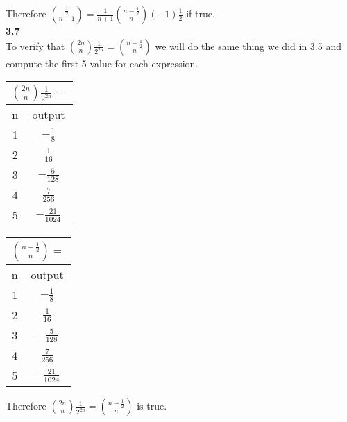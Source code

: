 \documentclass[10pt,a4paper]{report}
\begin{document}
	
	Therefore $\binom{\frac{1}{2}}{n+1} = \frac{1}{n+1}\binom{n-\frac{1}{2}}{n}(-1)\frac{1}{2}$ if true.\\
	\newline
	\textbf{3.7}\\
	To verify that $\binom{2n}{n}\frac{1}{2^{2n}} = \binom{n-\frac{1}{2}}{n}$ we will do the same thing we did in 3.5 and compute the first 5 value for each expression.\\
	\begin{center}
		\begin{tabular}{|c|c|}
			\hline
			\multicolumn{2}{|c|}{$\binom{2n}{n}\frac{1}{2^{2n}} = $} \\[.25cm]
			\hline
			n&output\\
			\hline
			1&$-\frac{1}{8}$\\[.25cm]
			\hline
			2&$\frac{1}{16}$\\[.25cm]
			\hline
			3&$-\frac{5}{128}$\\[.25cm]
			\hline
			4&$\frac{7}{256}$\\[.25cm]
			\hline
			5&$-\frac{21}{1024}$\\[.25cm]
			\hline
		\end{tabular}
		\hspace{2em}
		\begin{tabular}{|c|c|}
			\hline
			\multicolumn{2}{|c|}{$\binom{n-\frac{1}{2}}{n} = $} \\[.25cm]
			\hline
			n&output\\
			\hline
			1&$-\frac{1}{8}$\\[.25cm]
			\hline
			2&$\frac{1}{16}$\\[.25cm]
			\hline
			3&$-\frac{5}{128}$\\[.25cm]
			\hline
			4&$\frac{7}{256}$\\[.25cm]
			\hline
			5&$-\frac{21}{1024}$\\[.25cm]
			\hline
		\end{tabular}
	\end{center}
	
	Therefore $\binom{2n}{n}\frac{1}{2^{2n}} = \binom{n-\frac{1}{2}}{n}$ is true.\\
	\newline
\end{document}
